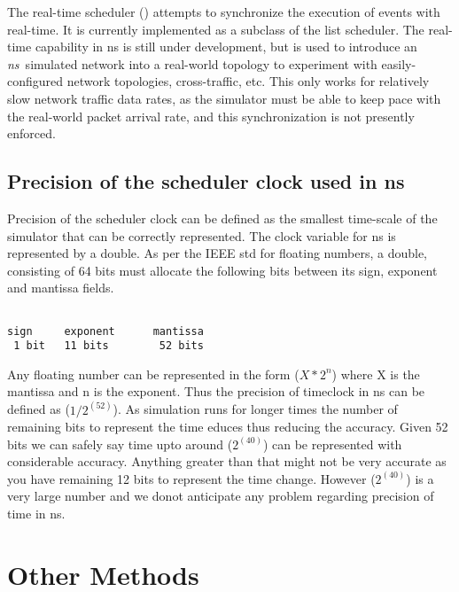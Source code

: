 The real-time scheduler ()
attempts to synchronize the execution of events with real-time.
It is currently implemented as a subclass of the list scheduler.
The real-time capability in ns is still under development, but is used
to introduce an \emph{ns}\ simulated network into a real-world topology
to experiment with easily-configured network topologies, cross-traffic, etc. 
This only works for relatively slow network traffic data rates, as the
simulator must be able to keep pace with the real-world packet arrival
rate, and this synchronization is not presently enforced.


\subsection{Precision of the scheduler clock used in ns}
\label{sec:precision}

Precision of the scheduler clock can be defined as the smallest time-scale 
of the simulator that can be correctly represented. The clock variable for 
ns is represented by a double. As per the IEEE std for floating numbers, 
a double, consisting of 64 bits must allocate the following bits between 
its sign, exponent and mantissa fields.

\begin{verbatim}

sign     exponent      mantissa
 1 bit   11 bits        52 bits
\end{verbatim}

Any floating number can be represented in the form ($X * 2^n$) where 
X is the mantissa and n is the exponent. Thus the precision of timeclock in ns can be defined as ($1/2^(52)$).
As simulation runs for longer times the number of remaining bits to represent 
the time educes thus reducing the accuracy. Given 52 bits we can safely say 
time upto around ($2^(40)$) can be represented with considerable accuracy. 
Anything greater than that might not be very accurate as you have remaining 12 
bits to represent the time change. However ($2^(40)$) is a very large number and 
we donot anticipate any problem regarding precision of time in ns.


\section{Other Methods}
\label{sec:other}

